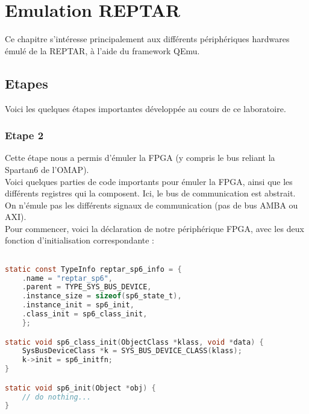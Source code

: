 
\chapter{Emulation REPTAR} %

\label{Chapitre 3} %


Ce chapitre s'intéresse principalement aux différents périphériques hardwares émulé de la REPTAR, à l'aide du framework QEmu.

\section{Etapes}
Voici les quelques étapes importantes développée au cours de ce laboratoire. 

\subsection{Etape 2}
Cette étape nous a permis d'émuler la FPGA (y compris le bus reliant la Spartan6 de l'OMAP).\\


Voici quelques parties de code importants pour émuler la FPGA, ainsi que les différents registres qui la composent. Ici, le bus de communication est abstrait. On n'émule pas les différents signaux de communication (pas de bus AMBA ou AXI).\\

Pour commencer, voici la déclaration de notre périphérique FPGA, avec les deux fonction d'initialisation correspondante : 
\begin{lstlisting}[language=C,caption=Spartan 6 device declaration]

static const TypeInfo reptar_sp6_info = { 
	.name = "reptar_sp6", 
	.parent = TYPE_SYS_BUS_DEVICE, 
	.instance_size = sizeof(sp6_state_t),
	.instance_init = sp6_init, 
	.class_init = sp6_class_init, 
	};

static void sp6_class_init(ObjectClass *klass, void *data) {
	SysBusDeviceClass *k = SYS_BUS_DEVICE_CLASS(klass);
	k->init = sp6_initfn;
}

static void sp6_init(Object *obj) {
	// do nothing...
}	
\end{lstlisting}

